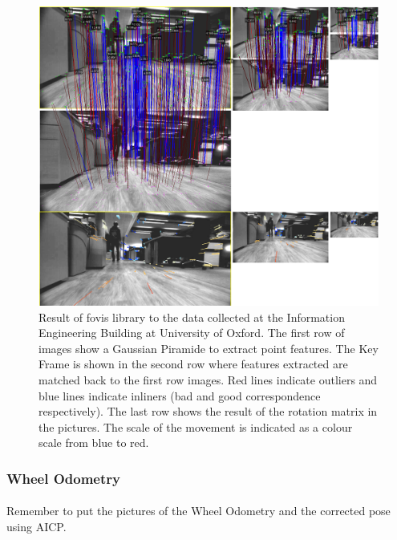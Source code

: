 \documentclass[11pt]{article}
\begin{document}
	\begin{figure}
	\begin{minipage}{0.65\textwidth}
		\centering
		\includegraphics[width=\textwidth]{VisualOdometry1}
	\end{minipage} \hfill
	\begin{minipage}{0.35\textwidth}
		\centering
		\caption[t]{Result of fovis library to the data collected at the Information Engineering Building at University of Oxford. The first row of images show a Gaussian Piramide to extract point features. The Key Frame is shown in the second row where features extracted are matched back to the first row images. Red lines indicate outliers and blue lines indicate inliners (bad and good correspondence respectively). The last row shows the result of the rotation matrix in the pictures. The scale of the movement is indicated as a colour scale from blue to red.}
		\label{fig:VisualOdometry1}	
	\end{minipage}				
	\end{figure}
	\subsubsection*{Wheel Odometry}
	\paragraph{}
	Remember to put the pictures of the Wheel Odometry and the corrected pose using AICP.
	
\end{document}
